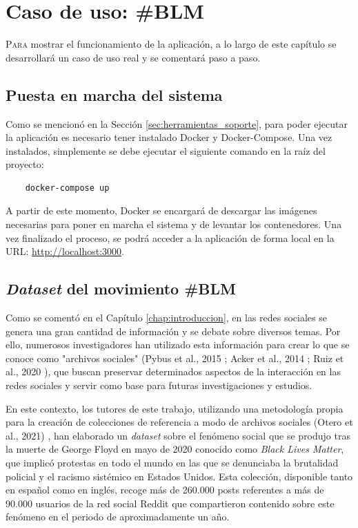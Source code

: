\chapter{Caso de uso: \#BLM}
\label{chap:casouso}

\lettrine{P}{ara} mostrar el funcionamiento de la aplicación, a lo largo de este capítulo se desarrollará un caso de uso real y se comentará paso a paso.

\section{Puesta en marcha del sistema}
\label{sec:casouso_puesta_en_marcha}

Como se mencionó en la Sección \ref{sec:herramientas_soporte}, para poder ejecutar la aplicación es necesario tener
instalado Docker y Docker-Compose. Una vez instalados, simplemente se debe ejecutar el siguiente comando en la raíz del
proyecto:

\bigskip
\begin{Verbatim}
	docker-compose up
\end{Verbatim}

\bigskip
A partir de este momento, Docker se encargará de descargar las imágenes necesarias para poner en marcha el sistema y de levantar los
contenedores. Una vez finalizado el proceso, se podrá acceder a la aplicación de forma local en la URL: \url{http://localhost:3000}.

\section{\textit{Dataset} del movimiento \#BLM}
\label{sec:casouso_dataset}

Como se comentó en el Capítulo \ref{chap:introduccion}, en las redes sociales se genera una gran cantidad de información y se debate sobre
diversos temas. Por ello, numerosos investigadores han utilizado esta información para crear lo que se conoce como "archivos sociales"
(Pybus et al., 2015 \cite{pybus2015hacking}; Acker et al., 2014 \cite{acker2014death}; Ruiz et al., 2020 \cite{ruiz2020cuentalo}),
que buscan preservar determinados aspectos de la interacción en las redes sociales y servir como base para futuras investigaciones
y estudios.

\bigskip
En este contexto, los tutores de este trabajo, utilizando una metodología propia para la creación de colecciones de referencia
a modo de archivos sociales
(Otero et al., 2021) \cite{oterorodilla2021}, han elaborado un \textit{dataset} sobre el fenómeno social
que se produjo tras la muerte de George Floyd en mayo de 2020 conocido como \textit{Black Lives Matter},
que implicó protestas en todo el mundo en las que se denunciaba la brutalidad policial y el racismo sistémico en Estados Unidos. Esta colección,
disponible tanto en español como en inglés, recoge más de 260.000 posts referentes a más de 90.000 usuarios de la red social Reddit que compartieron contenido sobre este
fenómeno en el periodo de aproximadamente un año.

